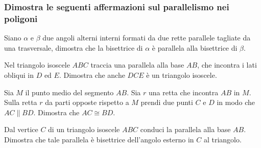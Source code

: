 \newpage %

\subsubsection*{Dimostra le seguenti affermazioni sul parallelismo 
nei poligoni}

\vspace{-6pt}

\begin{multicols}{2}


\begin{esercizio}
  \label{ese:3.40}
  Siano \(\alpha\) e \(\beta\) due angoli alterni interni formati da due 
  rette parallele tagliate da una trasversale, dimostra che la 
  bisettrice di \(\alpha\) è parallela alla bisettrice di \(\beta\).
\end{esercizio}


\begin{esercizio}
\label{ese:3.24}
Nel triangolo isoscele \(ABC\) traccia una parallela alla base \(AB\), 
che incontra i lati obliqui in \(D\) ed \(E\). Dimostra che anche \(DCE\) è 
un triangolo isoscele.
\end{esercizio}

\begin{esercizio}
\label{ese:3.26}
Sia \(M\) il punto medio del segmento \(AB\). Sia \(r\) una retta che 
incontra \(AB\) in \(M\). Sulla retta \(r\) da parti opposte rispetto a \(M\) 
prendi due punti \(C\) e \(D\) in modo che \(AC\parallel BD\). Dimostra che 
\(AC\cong BD\). 
\end{esercizio}

\begin{esercizio}
\label{ese:3.27}
Dal vertice \(C\) di un triangolo isoscele \(ABC\) conduci la parallela 
alla base \(AB\). Dimostra che tale parallela è bisettrice dell'angolo 
esterno in \(C\) al triangolo.
\end{esercizio}


\end{multicols}
